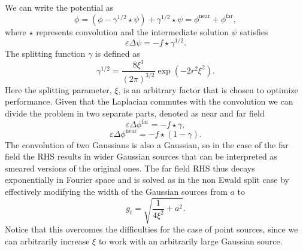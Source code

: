 \documentclass[ twoside,openright,titlepage,numbers=noenddot,%
headinclude,footinclude,cleardoublepage=empty,abstract=on,
BCOR=5mm,paper=b5,fontsize=11pt, dvipsnames
]{scrreprt}
\newcommand{\near}{\textrm{near}}
\newcommand{\far}{\textrm{far}}
\begin{document}
We can write the potential as
\begin{equation}
 \phi=(\phi - \gamma^{1/2}\star\psi) + \gamma^{1/2}\star\psi = \phi^{\near} + \phi^{\far},
\end{equation}
where $\star$ represents convolution and the intermediate solution $\psi$ satisfies
 \begin{equation}
 \varepsilon\Delta\psi=-f\star\gamma^{1/2}.
\end{equation}   
The splitting function $\gamma$ is defined as
 \begin{equation}
 \gamma^{1/2} = \frac{8\xi^3}{(2\pi)^{3/2}}\exp\left(-2r^2\xi^2\right).
\end{equation}
Here the splitting parameter, $\xi$, is an arbitrary factor that is chosen to optimize performance. 
Given that the Laplacian commutes with the convolution we can divide the problem in two separate parts, denoted as near and far field  
 \begin{equation}
 \varepsilon\Delta\phi^{\far}=-f\star\gamma,
\end{equation}   
\begin{equation}
 \label{tppoisson_ewald_near}
 \varepsilon\Delta\phi^{\near}=-f\star(1-\gamma).
\end{equation}   
The convolution of two Gaussians is also a Gaussian, so in the case of the far field the RHS results in wider Gaussian sources that can be interpreted as smeared versions of the original ones. The far field RHS thus decays exponentially in Fourier space and is solved as in the non Ewald split case by effectively modifying the width of the Gaussian sources from $a$ to
\begin{equation}
  g_t = \sqrt{\frac{1}{4\xi^2} + a^2}.
\end{equation}
Notice that this overcomes the difficulties for the case of point sources, since we can arbitrarily increase $\xi$ to work with an arbitrarily large Gaussian source.
\end{document}
